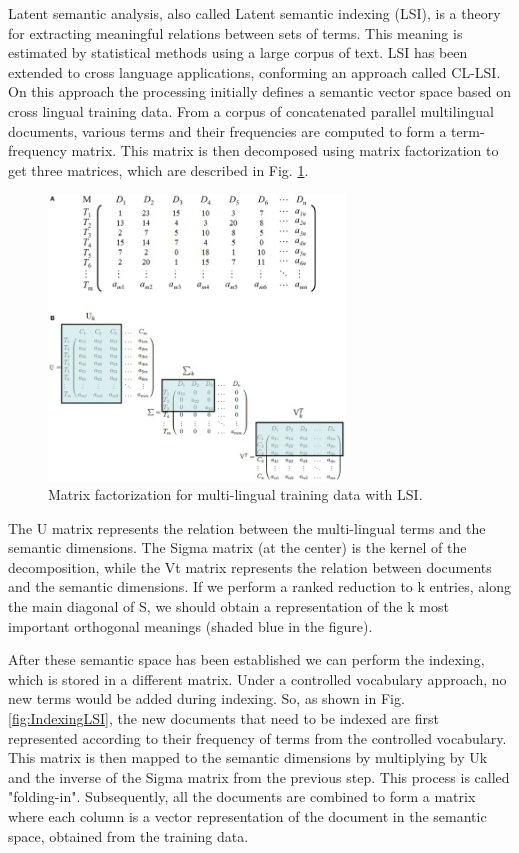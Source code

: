 \documentclass{llncs}
\begin{document}
Latent semantic analysis, also called Latent semantic indexing (LSI), is a theory for extracting meaningful relations between sets of terms. This meaning is estimated by statistical methods using a large corpus of text\cite{landauer1997solution}. LSI has been extended to cross language applications, conforming an approach called CL-LSI\cite{dumais1997automatic}. On this approach the processing initially defines a semantic vector space based on cross lingual training data. From a corpus of concatenated parallel multilingual documents, various terms and their frequencies are computed to form a term-frequency matrix. This matrix is then decomposed using matrix factorization to get three matrices, which are described in Fig. \ref{fig:LSI}.

\begin{figure}[h!]
  \centering
      \includegraphics[width=0.7\textwidth]{LatentSemanticIndexing.jpg}
  \caption{Matrix factorization for multi-lingual training data with LSI.}
\label{fig:LSI}
\end{figure}

The U matrix represents the relation between the multi-lingual terms and the semantic dimensions. The Sigma matrix (at the center) is the kernel of the decomposition, while the Vt matrix represents the relation between documents and the semantic dimensions. If we perform a ranked reduction to k entries, along the main diagonal of S, we should obtain a representation of the k most important orthogonal meanings (shaded blue in the figure).

After these semantic space has been established we can perform the indexing, which is stored in a different matrix. Under a controlled vocabulary approach, no new terms would be added during indexing. So, as shown in Fig. \ref{fig:IndexingLSI}, the new documents that need to be indexed are first represented according to their frequency of terms from the controlled vocabulary. This matrix is then mapped to the semantic dimensions by multiplying by Uk and the inverse of the Sigma matrix from the previous step. This process is called "folding-in". Subsequently, all the documents are combined to form a matrix where each column is a vector representation of the document in the semantic space, obtained from the training data. 
\end{document}

